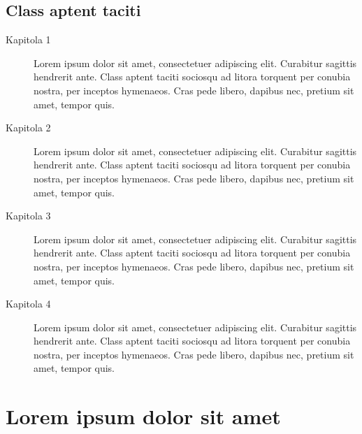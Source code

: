 \lipsum[2] \cite{def:1, def:2}

\subsection{Class aptent taciti}

\lipsum[2-3]

\begin{description}
\item[Kapitola 1] Lorem ipsum dolor sit amet, consectetuer adipiscing elit.
Curabitur sagittis hendrerit ante. Class aptent taciti sociosqu ad litora
torquent per conubia nostra, per inceptos hymenaeos. Cras pede libero, dapibus
nec, pretium sit amet, tempor quis.

\item[Kapitola 2] Lorem ipsum dolor sit amet, consectetuer adipiscing elit.
Curabitur sagittis hendrerit ante. Class aptent taciti sociosqu ad litora
torquent per conubia nostra, per inceptos hymenaeos. Cras pede libero, dapibus
nec, pretium sit amet, tempor quis.

\item[Kapitola 3] Lorem ipsum dolor sit amet, consectetuer adipiscing elit.
Curabitur sagittis hendrerit ante. Class aptent taciti sociosqu ad litora
torquent per conubia nostra, per inceptos hymenaeos. Cras pede libero, dapibus
nec, pretium sit amet, tempor quis.

\item[Kapitola 4] Lorem ipsum dolor sit amet, consectetuer adipiscing elit.
Curabitur sagittis hendrerit ante. Class aptent taciti sociosqu ad litora
torquent per conubia nostra, per inceptos hymenaeos. Cras pede libero, dapibus
nec, pretium sit amet, tempor quis.
\end{description}

\lipsum[2]

\section{Lorem ipsum dolor sit amet}

\lipsum[3-5]
